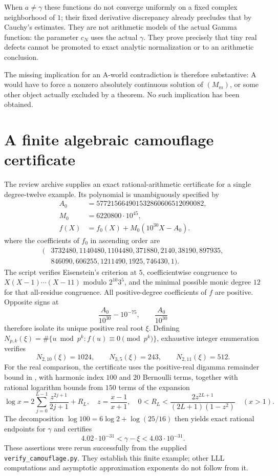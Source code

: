 \documentclass[11pt,a4paper]{article}
\theoremstyle{definition}
\theoremstyle{remark}
\theoremstyle{plain}
\numberwithin{equation}{section}
\begin{document}
When $a\ne\gamma$ these functions do not converge uniformly on a fixed
complex neighborhood of $1$; their fixed derivative discrepancy already
precludes that by Cauchy's estimates. They are not arithmetic models of
the actual Gamma function: the parameter $c_N$ uses the actual $\gamma$.
They prove precisely that tiny real defects cannot be promoted to
exact analytic normalization or to an arithmetic conclusion.

The missing implication for an A-world contradiction is therefore
substantive: A would have to force a nonzero absolutely continuous
solution of $(M_m)$, or some other object actually excluded by a theorem.
No such implication has been obtained.

\section{A finite algebraic camouflage certificate}
The review archive supplies an exact rational-arithmetic certificate for a
single degree-twelve example. Its polynomial is unambiguously specified by
\begin{align*}
 A_0&=577215664901532860606512090082,\\
 M_0&=6220800\cdot10^{45},\\
 f(X)&=f_0(X)+M_0(10^{30}X-A_0).
\end{align*}
where the coefficients of $f_0$ in ascending order are
\[
 \begin{split}
 (&3732480,1140480,1104480,371880,2140,38190,897935,\\
  &846090,606255,1211490,1925,746430,1).
 \end{split}
\]
The script verifies Eisenstein's criterion at $5$, coefficientwise
congruence to $X(X-1)\cdots(X-11)$ modulo $2^{10}3^5$, and the
minimal possible monic degree $12$ for that all-residue congruence.
All positive-degree coefficients of $f$ are positive. Opposite signs at
\[
 \frac{A_0}{10^{30}}-10^{-75},\qquad \frac{A_0}{10^{30}}
\]
therefore isolate its unique positive real root $\xi$. Defining
$N_{p,k}(\xi)=\#\{u\bmod p^k:f(u)\equiv0\pmod{p^k}\}$, exhaustive
integer enumeration verifies
\[
 N_{2,10}(\xi)=1024,\qquad N_{3,5}(\xi)=243,\qquad
 N_{2,11}(\xi)=512.
\]
For the real comparison, the certificate uses the positive-real digamma
remainder bound in \cite{DLMF}, with harmonic index $100$ and $20$
Bernoulli terms, together with rational logarithm bounds from $150$
terms of the expansion
\[
 \log x=2\sum_{j=0}^{L-1}\frac{z^{2j+1}}{2j+1}+R_L,
 \quad z=\frac{x-1}{x+1},\quad
 0<R_L<\frac{2z^{2L+1}}{(2L+1)(1-z^2)}\quad(x>1).
\]
The decomposition $\log100=6\log2+\log(25/16)$ then yields exact
rational endpoints for $\gamma$ and certifies
\[
 4.02\cdot10^{-31}<\gamma-\xi<4.03\cdot10^{-31}.
\]
These assertions were rerun successfully from the supplied
\texttt{verify\_camouflage.py}. They establish this finite example;
other LLL computations and asymptotic approximation exponents do not
follow from it.
\end{document}

